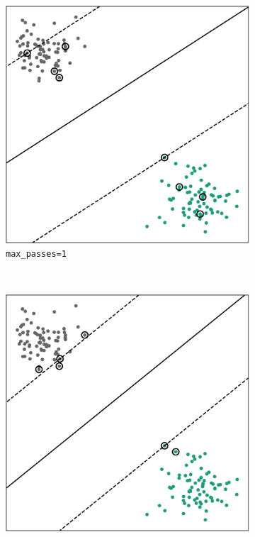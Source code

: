 \begin{figure}
    \centering
    \begin{subfigure}[b]{0.28\textwidth}
        \includegraphics[width=\textwidth]{media_saved/own_test_mpasses_1.pdf}
        \caption{\texttt{max\_passes=1}}
        \label{fig:max_passs_1}
    \end{subfigure}
    \quad
    ~ %
    \begin{subfigure}[b]{0.28\textwidth}
        \includegraphics[width=\textwidth]{media_saved/own_test_mpasses_15.pdf}

\end{subfigure}
\end{figure}
